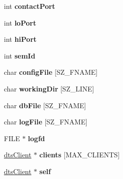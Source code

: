 \begin{CompactItemize}
\item 
\hypertarget{structDTS_28136ecd4962ae974013a04393d66257}{
int \textbf{contactPort}}
\label{structDTS_28136ecd4962ae974013a04393d66257}

\item 
\hypertarget{structDTS_4aaaa5df7c4a75dd948e4dfa5f89ce39}{
int \textbf{loPort}}
\label{structDTS_4aaaa5df7c4a75dd948e4dfa5f89ce39}

\item 
\hypertarget{structDTS_379f8644e7c2cdf7f52cd23373f83478}{
int \textbf{hiPort}}
\label{structDTS_379f8644e7c2cdf7f52cd23373f83478}

\item 
\hypertarget{structDTS_179add0279547dc08bd448e993e07f86}{
int \textbf{semId}}
\label{structDTS_179add0279547dc08bd448e993e07f86}

\item 
\hypertarget{structDTS_1c07c02603d3a9ea61cba6d0f7ec1d97}{
char \textbf{configFile} \mbox{[}SZ\_\-FNAME\mbox{]}}
\label{structDTS_1c07c02603d3a9ea61cba6d0f7ec1d97}

\item 
\hypertarget{structDTS_7331204c691544bd282f28db3cc3c0e3}{
char \textbf{workingDir} \mbox{[}SZ\_\-LINE\mbox{]}}
\label{structDTS_7331204c691544bd282f28db3cc3c0e3}

\item 
\hypertarget{structDTS_851f43705819d96bb7decad8be0ca743}{
char \textbf{dbFile} \mbox{[}SZ\_\-FNAME\mbox{]}}
\label{structDTS_851f43705819d96bb7decad8be0ca743}

\item 
\hypertarget{structDTS_d8622e6a90cc31cbe226c6a47ee64043}{
char \textbf{logFile} \mbox{[}SZ\_\-FNAME\mbox{]}}
\label{structDTS_d8622e6a90cc31cbe226c6a47ee64043}

\item 
\hypertarget{structDTS_8b7eb96dd1181820584f2a611b8ab550}{
FILE $\ast$ \textbf{logfd}}
\label{structDTS_8b7eb96dd1181820584f2a611b8ab550}

\item 
\hypertarget{structDTS_923a3c29d6fa8e697ac90d75c12da7cd}{
\hyperlink{structdtsClient}{dtsClient} $\ast$ \textbf{clients} \mbox{[}MAX\_\-CLIENTS\mbox{]}}
\label{structDTS_923a3c29d6fa8e697ac90d75c12da7cd}

\item 
\hypertarget{structDTS_bdd1208f65eb35407d1348fccbe0d478}{
\hyperlink{structdtsClient}{dtsClient} $\ast$ \textbf{self}}
\label{structDTS_bdd1208f65eb35407d1348fccbe0d478}


\end{CompactItemize}

